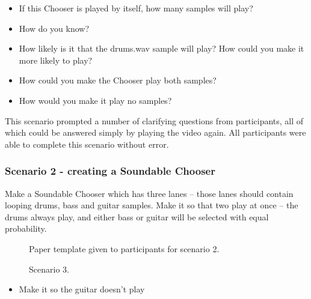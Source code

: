 \documentclass{ppig}
\begin{document}
\begin{itemize}
\item
  If this Chooser is played by itself, how many samples will play?
\item
  How do you know?
\item
  How likely is it that the drums.wav sample will play? How could you
  make it more likely to play?
\item
  How could you make the Chooser play both samples?
\item
  How would you make it play no samples?
\end{itemize}

This scenario prompted a number of clarifying questions from
participants, all of which could be answered simply by playing the video
again. All participants were able to complete this scenario without
error.

\hypertarget{scenario-2---creating-a-soundable-chooser}{%
\subsubsection{Scenario 2 - creating a Soundable
Chooser}\label{scenario-2---creating-a-soundable-chooser}}

Make a Soundable Chooser which has three lanes -- those lanes should
contain looping drums, bass and guitar samples. Make it so that two play
at once -- the drums always play, and either bass or guitar will be
selected with equal probability.

\begin{figure}[!h]
	\begin{floatrow}
			{\caption{Paper template given to participants for scenario 2.}\label{fig:scenario2}}
			{\caption{Scenario 3.}\label{fig:scenario3}}
	\end{floatrow}
\end{figure}


\begin{itemize}
\item
  Make it so the guitar doesn't play
\end{itemize}
\end{document}
